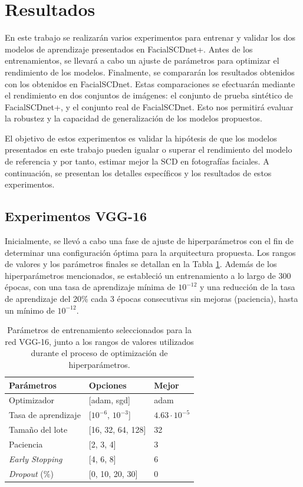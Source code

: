 \section{Resultados}

En este trabajo se realizarán varios experimentos para entrenar y validar los dos modelos de aprendizaje presentados en FacialSCDnet+. Antes de los entrenamientos, se llevará a cabo un ajuste de parámetros para optimizar el rendimiento de los modelos. Finalmente, se compararán los resultados obtenidos con los obtenidos en FacialSCDnet. Estas comparaciones se efectuarán mediante el rendimiento en dos conjuntos de imágenes: el conjunto de prueba sintético de FacialSCDnet+, y el conjunto real de FacialSCDnet. Esto nos permitirá evaluar la robustez y la capacidad de generalización de los modelos propuestos.

El objetivo de estos experimentos es validar la hipótesis de que los modelos presentados en este trabajo pueden igualar o superar el rendimiento del modelo de referencia y por tanto, estimar mejor la SCD en fotografías faciales. A continuación, se presentan los detalles específicos y los resultados de estos experimentos.


\subsection{Experimentos VGG-16}

Inicialmente, se llevó a cabo una fase de ajuste de hiperparámetros con el fin de determinar una configuración óptima para la arquitectura propuesta. Los rangos de valores y los parámetros finales se detallan en la Tabla \ref{hiper-vgg}. Además de los hiperparámetros mencionados, se estableció un entrenamiento a lo largo de 300 épocas, con una tasa de aprendizaje mínima de $10^{-12}$ y una reducción de la tasa de aprendizaje del 20\% cada 3 épocas consecutivas sin mejoras (paciencia), hasta un mínimo de $10^{-12}$.

\begin{table}[h]
	\centering
	\begin{tabular}{lll}
	\hline
	Parámetros          & Opciones                 & Mejor \\ \hline
	Optimizador         & {[}adam, sgd{]}          & adam  \\
	Tasa de aprendizaje & {[}$10^{-6}$, $10^{-3}${]}         & $4.63 \cdot 10^{-5}$      \\
	Tamaño del lote    & {[}16, 32, 64, 128{]}    & 32      \\
	Paciencia           & {[}2, 3, 4{]}            & 3     \\
	\textit{Early Stopping}     & {[}4, 6, 8{]}            & 6     \\
	\textit{Dropout} (\%)    & {[}0, 10, 20, 30{]} &  0 \\ \hline
	\end{tabular}
	\caption[Selección de parámetros de entrenamiento VGG-16.]{Parámetros de entrenamiento seleccionados para la red VGG-16, junto a los rangos de valores utilizados durante el proceso de optimización de hiperparámetros.}
	\label{hiper-vgg}
\end{table}

